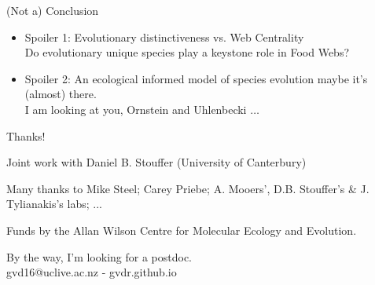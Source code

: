 \documentclass[ignorenonframetext,]{beamer}
\begin{document}
\begin{frame}{(Not a) Conclusion}

\begin{itemize}[<+->]
\item
  Spoiler 1: Evolutionary distinctiveness vs. Web Centrality\\
  {\small Do evolutionary unique species play a keystone role in Food Webs?}
\item
  Spoiler 2: An ecological informed model of species evolution maybe
  it's (almost) there.\\
  {\small I am looking at you, Ornstein and Uhlenbecki $\dots$}
\end{itemize}

\end{frame}

\begin{frame}{Thanks!}

\begin{centering}

Joint work with  
Daniel B. Stouffer (University of Canterbury)

Many thanks to  
Mike Steel; Carey Priebe; A. Mooers', D.B. Stouffer's \& J. Tylianakis's labs; ...

Funds by the Allan Wilson Centre for Molecular Ecology and Evolution.

\vspace{2cm}

\small{By the way, I'm looking for a postdoc.\\ gvd16@uclive.ac.nz - gvdr.github.io}

\end{centering}

\end{frame}
\end{document}
